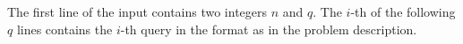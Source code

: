 The first line of the input contains two integers $n$ and $q$.
The $i$-th of the following $q$ lines contains the $i$-th query in the format as in the problem description.